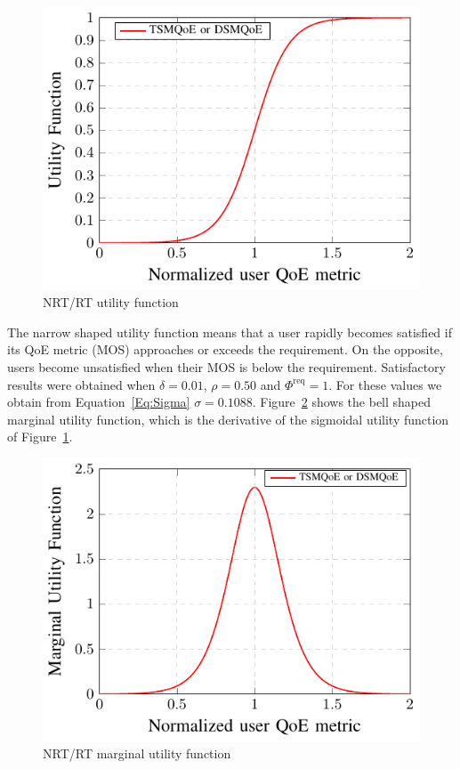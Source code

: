\documentclass[12pt]{article}
\newcommand{\FigRef}[1]{Figure~\ref{#1}}
\newcommand{\EqRef}[1]{Equation~\ref{#1}}
\begin{document}
\begin{figure}
	\centering
	\includegraphics[width=0.55\linewidth]{figs_wp2/figs_BRUNO_PEDRO/userUtility}
	\caption{NRT/RT utility function}	
	\label{Fig:UserUtility}
\end{figure}	

The narrow shaped utility function   means that a user rapidly becomes satisfied if its \ac{QoE} metric (\ac{MOS}) approaches or exceeds the requirement. On the opposite, users become unsatisfied when their \ac{MOS} is below the requirement. Satisfactory results  were obtained when $ \delta = 0.01$, $\rho = 0.50$ and $\Phi^{\text{req}} = 1$. For these values we obtain from \EqRef{Eq:Sigma} $\sigma = 0.1088$. \FigRef{Fig:Bell} shows the bell shaped marginal utility function, which is the derivative of the sigmoidal utility function of \FigRef{Fig:UserUtility}. 	

\begin{figure}
	\centering
	\includegraphics[width=0.55\linewidth]{figs_wp2/figs_BRUNO_PEDRO/sino}
	\caption{NRT/RT marginal utility function}	
	\label{Fig:Bell}	
\end{figure}

\end{document}
